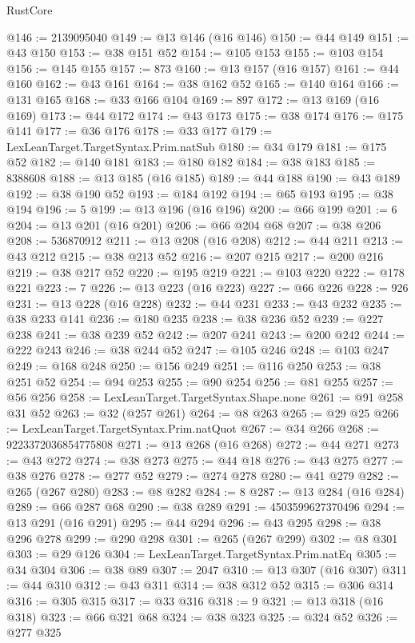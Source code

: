 \begin{lexlean}{RustCore}
\begin{coremodule}
@146 := 2139095040
@149 := @13 @146 (@16 @146)
@150 := @44 @149
@151 := @43 @150
@153 := @38 @151 @52
@154 := @105 @153
@155 := @103 @154
@156 := @145 @155
@157 := 873
@160 := @13 @157 (@16 @157)
@161 := @44 @160
@162 := @43 @161
@164 := @38 @162 @52
@165 := @140 @164
@166 := @131 @165
@168 := @33 @166 @104
@169 := 897
@172 := @13 @169 (@16 @169)
@173 := @44 @172
@174 := @43 @173
@175 := @38 @174
@176 := @175 @141
@177 := @36 @176
@178 := @33 @177
@179 := LexLeanTarget.TargetSyntax.Prim.natSub
@180 := @34 @179
@181 := @175 @52
@182 := @140 @181
@183 := @180 @182
@184 := @38 @183
@185 := 8388608
@188 := @13 @185 (@16 @185)
@189 := @44 @188
@190 := @43 @189
@192 := @38 @190 @52
@193 := @184 @192
@194 := @65 @193
@195 := @38 @194
@196 := 5
@199 := @13 @196 (@16 @196)
@200 := @66 @199
@201 := 6
@204 := @13 @201 (@16 @201)
@206 := @66 @204 @68
@207 := @38 @206
@208 := 536870912
@211 := @13 @208 (@16 @208)
@212 := @44 @211
@213 := @43 @212
@215 := @38 @213 @52
@216 := @207 @215
@217 := @200 @216
@219 := @38 @217 @52
@220 := @195 @219
@221 := @103 @220
@222 := @178 @221
@223 := 7
@226 := @13 @223 (@16 @223)
@227 := @66 @226
@228 := 926
@231 := @13 @228 (@16 @228)
@232 := @44 @231
@233 := @43 @232
@235 := @38 @233 @141
@236 := @180 @235
@238 := @38 @236 @52
@239 := @227 @238
@241 := @38 @239 @52
@242 := @207 @241
@243 := @200 @242
@244 := @222 @243
@246 := @38 @244 @52
@247 := @105 @246
@248 := @103 @247
@249 := @168 @248
@250 := @156 @249
@251 := @116 @250
@253 := @38 @251 @52
@254 := @94 @253
@255 := @90 @254
@256 := @81 @255
@257 := @56 @256
@258 := LexLeanTarget.TargetSyntax.Shape.none
@261 := @91 @258 @31 @52
@263 := @32 (@257 @261)
@264 := @8 @263
@265 := @29 @25
@266 := LexLeanTarget.TargetSyntax.Prim.natQuot
@267 := @34 @266
@268 := 9223372036854775808
@271 := @13 @268 (@16 @268)
@272 := @44 @271
@273 := @43 @272
@274 := @38 @273
@275 := @44 @18
@276 := @43 @275
@277 := @38 @276
@278 := @277 @52
@279 := @274 @278
@280 := @41 @279
@282 := @265 (@267 @280)
@283 := @8 @282
@284 := 8
@287 := @13 @284 (@16 @284)
@289 := @66 @287 @68
@290 := @38 @289
@291 := 4503599627370496
@294 := @13 @291 (@16 @291)
@295 := @44 @294
@296 := @43 @295
@298 := @38 @296 @278
@299 := @290 @298
@301 := @265 (@267 @299)
@302 := @8 @301
@303 := @29 @126
@304 := LexLeanTarget.TargetSyntax.Prim.natEq
@305 := @34 @304
@306 := @38 @89
@307 := 2047
@310 := @13 @307 (@16 @307)
@311 := @44 @310
@312 := @43 @311
@314 := @38 @312 @52
@315 := @306 @314
@316 := @305 @315
@317 := @33 @316
@318 := 9
@321 := @13 @318 (@16 @318)
@323 := @66 @321 @68
@324 := @38 @323
@325 := @324 @52
@326 := @277 @325

\end{coremodule}
\end{lexlean}
